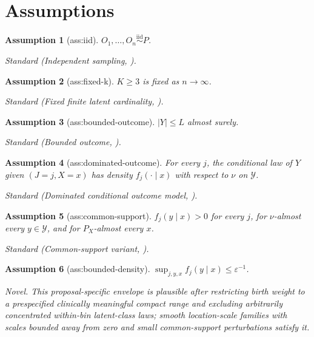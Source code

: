 \documentclass{article}
\newtheorem{assumption}{Assumption}
\begin{document}
\section{Assumptions}

\begin{assumption}[ass:iid]\label{ass:iid}
\(O_1,\ldots,O_n\stackrel{\mathrm{iid}}{\sim}P\).
\par\smallskip\noindent\emph{Standard} (Independent sampling, \cite{ZhouTchetgenTchetgen2026}).
\end{assumption}

\begin{assumption}[ass:fixed-k]\label{ass:fixed-k}
\(K\geq3\) is fixed as \(n\to\infty\).
\par\smallskip\noindent\emph{Standard} (Fixed finite latent cardinality, \cite{AllmanMatiasRhodes2009}).
\end{assumption}

\begin{assumption}[ass:bounded-outcome]\label{ass:bounded-outcome}
\(|Y|\leq L\) almost surely.
\par\smallskip\noindent\emph{Standard} (Bounded outcome, \cite{ZhouTchetgenTchetgen2026}).
\end{assumption}

\begin{assumption}[ass:dominated-outcome]\label{ass:dominated-outcome}
For every \(j\), the conditional law of \(Y\) given \((J=j,X=x)\) has density \(f_j(\cdot\mid x)\) with respect to \(\nu\) on \(\mathcal Y\).
\par\smallskip\noindent\emph{Standard} (Dominated conditional outcome model, \cite{GuoOgburnShpitser2026}).
\end{assumption}

\begin{assumption}[ass:common-support]\label{ass:common-support}
\(f_j(y\mid x)>0\) for every \(j\), for \(\nu\)-almost every \(y\in\mathcal Y\), and for \(P_X\)-almost every \(x\).
\par\smallskip\noindent\emph{Standard} (Common-support variant, \cite{GuoOgburnShpitser2026}).
\end{assumption}

\begin{assumption}[ass:bounded-density]\label{ass:bounded-density}
\(\sup_{j,y,x}f_j(y\mid x)\leq\varepsilon^{-1}\).
\par\smallskip\noindent\emph{Novel.} This proposal-specific envelope is plausible after restricting birth weight to a prespecified clinically meaningful compact range and excluding arbitrarily concentrated within-bin latent-class laws; smooth location-scale families with scales bounded away from zero and small common-support perturbations satisfy it.
\end{assumption}
\end{document}

